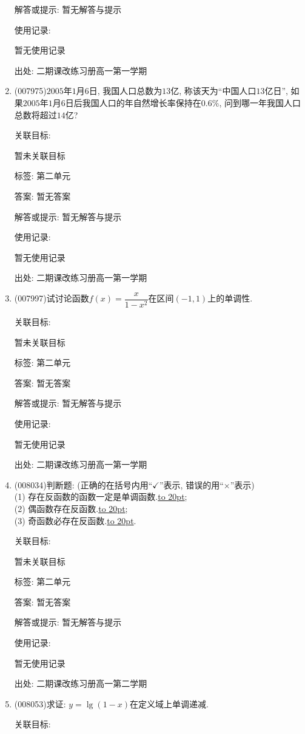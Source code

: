 \documentclass[10pt,a4paper]{article}
\newcommand{\blank}[1]{\underline{\hbox to #1pt{}}}
\begin{document}
\begin{enumerate}[1.]
解答或提示: 暂无解答与提示

使用记录:

暂无使用记录


出处: 二期课改练习册高一第一学期
\item { (007975)}$2005$年$1$月$6$日, 我国人口总数为$13$亿, 称该天为``中国人口$13$亿日'', 如果$2005$年$1$月$6$日后我国人口的年自然增长率保持在$0.6\%$, 问到哪一年我国人口总数将超过$14$亿?


关联目标:

暂未关联目标



标签: 第二单元

答案: 暂无答案

解答或提示: 暂无解答与提示

使用记录:

暂无使用记录


出处: 二期课改练习册高一第一学期
\item { (007997)}试讨论函数$f(x)=\dfrac x{1-x^2}$在区间$(-1,1)$上的单调性.


关联目标:

暂未关联目标



标签: 第二单元

答案: 暂无答案

解答或提示: 暂无解答与提示

使用记录:

暂无使用记录


出处: 二期课改练习册高一第一学期
\item { (008034)}判断题: (正确的在括号内用``$\checkmark$''表示, 错误的用``$\times$''表示)\\
(1) 存在反函数的函数一定是单调函数.\blank{20};\\
(2) 偶函数存在反函数.\blank{20};\\
(3) 奇函数必存在反函数.\blank{20}.


关联目标:

暂未关联目标



标签: 第二单元

答案: 暂无答案

解答或提示: 暂无解答与提示

使用记录:

暂无使用记录


出处: 二期课改练习册高一第二学期
\item { (008053)}求证: $y=\lg(1-x)$在定义域上单调递减.


关联目标:


\end{enumerate}
\end{document}
